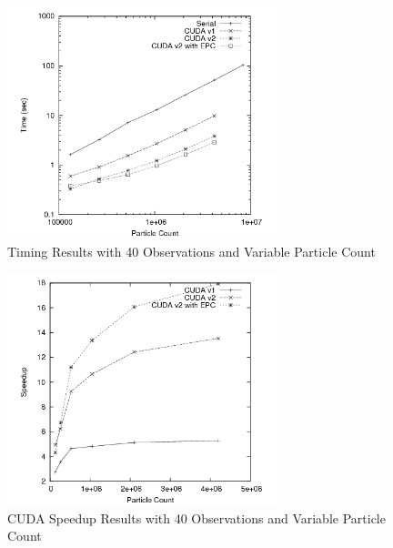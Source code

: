 \documentclass{article}
\begin{document}
\begin{figure}
\centering
\includegraphics[width=0.7\textwidth]{data/timing_results.png}
\caption{Timing Results with 40 Observations and Variable Particle Count}
\label{final_timing1}
\end{figure}

\begin{figure}
\centering
\includegraphics[width=0.7\textwidth]{data/timing_results_speedup.png}
\caption{CUDA Speedup Results with 40 Observations and Variable Particle Count}
\label{final_timing2}
\end{figure}
\end{document}
